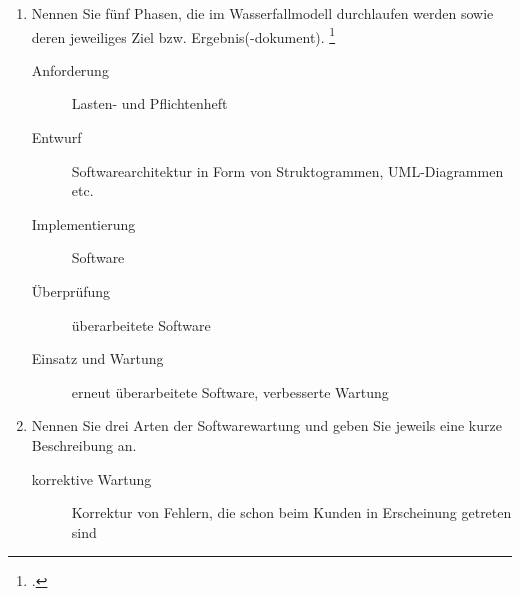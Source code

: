\documentclass{bschlangaul-aufgabe}
\begin{document}

\begin{enumerate}


\item Nennen Sie fünf Phasen, die im Wasserfallmodell durchlaufen werden
sowie deren jeweiliges Ziel bzw.
Ergebnis(-dokument).
\footcite{examen:66116:2020:09}

\begin{bAntwort}
\begin{description}
\item[Anforderung]

Lasten- und Pflichtenheft

\item[Entwurf]

Softwarearchitektur in Form von Struktogrammen, UML-Diagrammen etc.

\item[Implementierung]

Software

\item[Überprüfung]

überarbeitete Software

\item[Einsatz und Wartung]

erneut überarbeitete Software, verbesserte Wartung
\end{description}
\end{bAntwort}


\item Nennen Sie drei Arten der Softwarewartung und geben Sie jeweils
eine kurze Beschreibung an.

\begin{bAntwort}
\begin{description}
\item[korrektive Wartung]

Korrektur von Fehlern, die schon beim Kunden in Erscheinung
getreten sind


\end{description}
\end{bAntwort}
\end{enumerate}
\end{document}
